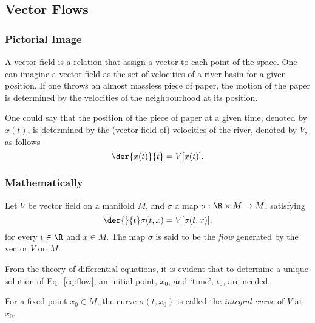 \subsection{Vector Flows}

\subsubsection*{Pictorial Image}

A vector field is a relation that assign a vector to each point of the space. One can imagine a vector field as the set of velocities of a river basin for a given position. If one throws an almost massless piece of paper, the motion of the paper is determined by the velocities of the neighbourhood at its position.

One could say that the position of the piece of paper at a given time, denoted by $x(t)$, is determined by the (vector field of) velocities of the river, denoted by $V$, as follows
\begin{equation}
  \der{x(t)}{t} = V[x(t)].
\end{equation}

\subsubsection*{Mathematically}

Let $V$ be  vector field  on a manifold $M$, and $\sigma$ a map  \mbox{$\sigma:\R\times M\to M$}, satisfying
\begin{equation}
  \der{}{t}\sigma(t,x) = V[\sigma(t,x)],
  \label{eq:flow}
\end{equation}
for every $t\in \R$ and $x\in M$. The map $\sigma$ is said to be the \emph{flow} 
generated by the vector $V$ on $M$.

From the theory of differential equations, it is evident that to determine a unique solution of Eq.~\eqref{eq:flow}, an initial point, $x_0$, and `time', $t_0$, are needed.

For a fixed point $x_0\in M$, the curve $\sigma(t,x_0)$ is called the \emph{integral curve} 
of $V$ at $x_0$.


